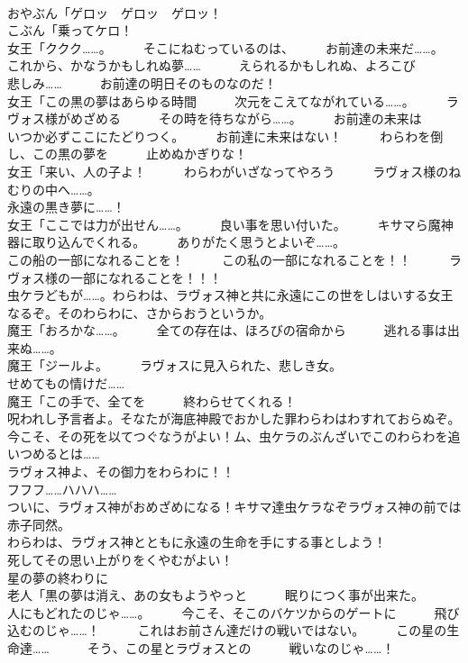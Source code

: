 \documentclass[8pt]{extreport}
\begin{document}
\begin{CJK}{UTF8}{min}
\\	おやぶん「ゲロッ　ゲロッ　ゲロッ！	
\\	こぶん「乗ってケロ！	
\\	女王「ククク……。　　　そこにねむっているのは、　　　お前達の未来だ……。　　　これから、かなうかもしれぬ夢……　　　えられるかもしれぬ、よろこび　　　悲しみ……　　　お前達の明日そのものなのだ！	
\\	女王「この黒の夢はあらゆる時間　　　次元をこえてながれている……。　　　ラヴォス様がめざめる　　　その時を待ちながら……。　　　お前達の未来は　　　いつか必ずここにたどりつく。　　　お前達に未来はない！　　　わらわを倒し、この黒の夢を　　　止めぬかぎりな！	
\\	女王「来い、人の子よ！　　　わらわがいざなってやろう　　　ラヴォス様のねむりの中へ……。	
\\	永遠の黒き夢に……！	
\\	女王「ここでは力が出せん……。　　　良い事を思い付いた。　　　キサマら魔神器に取り込んでくれる。　　　ありがたく思うとよいぞ……。	
\\	この船の一部になれることを！　　　この私の一部になれることを！！　　　ラヴォス様の一部になれることを！！！	
\\	虫ケラどもが……。わらわは、ラヴォス神と共に永遠にこの世をしはいする女王なるぞ。そのわらわに、さからおうというか。	
\\	魔王「おろかな……。　　　全ての存在は、ほろびの宿命から　　　逃れる事は出来ぬ……。	
\\	魔王「ジールよ。　　　ラヴォスに見入られた、悲しき女。	
\\	せめてもの情けだ……	
\\	魔王「この手で、全てを　　　終わらせてくれる！	
\\	呪われし予言者よ。そなたが海底神殿でおかした罪わらわはわすれておらぬぞ。今こそ、その死を以てつぐなうがよい！ム、虫ケラのぶんざいでこのわらわを追いつめるとは……	
\\	ラヴォス神よ、その御力をわらわに！！	
\\	フフフ……ハハハ……	
\\	ついに、ラヴォス神がおめざめになる！キサマ達虫ケラなぞラヴォス神の前では赤子同然。	
\\	わらわは、ラヴォス神とともに永遠の生命を手にする事としよう！	
\\	死してその思い上がりをくやむがよい！	
\\	星の夢の終わりに	
\\	老人「黒の夢は消え、あの女もようやっと　　　眠りにつく事が出来た。　　　人にもどれたのじゃ……。　　　今こそ、そこのバケツからのゲートに　　　飛び込むのじゃ……！　　　これはお前さん達だけの戦いではない。　　　この星の生命達……　　　そう、この星とラヴォスとの　　　戦いなのじゃ……！	

\end{CJK}
\end{document}
